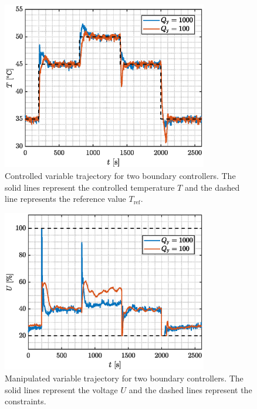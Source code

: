 \documentclass[preprint,12pt]{elsarticle}
\begin{document}
	\begin{figure}
		\begin{center}
			\includegraphics[width=0.8\textwidth]{images/CV_boundaries}
			\caption{Controlled variable trajectory for two boundary controllers. The solid lines represent the controlled temperature $T$ and the dashed line represents the reference value $T_{\mathrm{ref}}$.}
			\label{fig:CV_boundaries}
		\end{center}
	\end{figure}
	
	\begin{figure}
		\begin{center}
			\includegraphics[width=0.8\textwidth]{images/MV_boundaries}
			\caption{Manipulated variable trajectory for two boundary controllers. The solid lines represent the voltage $U$ and the dashed lines represent the constraints.}
			\label{fig:MV_boundaries}
		\end{center}
	\end{figure}
	
\end{document}
